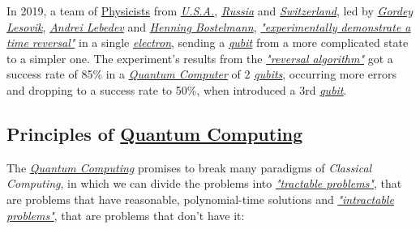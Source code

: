 \documentclass[conference]{IEEEtran}
\begin{document}
\vspace{4pt}

In 2019, a team of \href{https://en.wikipedia.org/wiki/Physicist}{Physicists} from \href{https://en.wikipedia.org/wiki/United_States}{\textit{U.S.A.}}, \href{https://en.wikipedia.org/wiki/Russia}{\textit{Russia}} and \href{https://en.wikipedia.org/wiki/Switzerland}{\textit{Switzerland}}, led by \href{https://www.researchgate.net/profile/Gordey_Lesovik}{\textit{Gordey Lesovik}}, \href{https://www.researchgate.net/profile/Andrey_Lebedev4}{\textit{Andrei Lebedev}} and \href{https://www.researchgate.net/profile/Henning_Bostelmann}{\textit{Henning Bostelmann}}, \href{https://en.wikipedia.org/wiki/Electron}{\textit{"experimentally demonstrate a time reversal"}} in a single \href{https://en.wikipedia.org/wiki/Electron}{\textit{electron}}, sending a \href{https://en.wikipedia.org/wiki/Qubit}{\textit{qubit}} from a more complicated state to a simpler one. The experiment's results from the \href{https://www.researchgate.net/publication/322160389_Arrow_of_time_and_its_reversal_on_IBM_quantum_computer}{\textit{"reversal algorithm"}} got a success rate of 85\% in a \href{https://en.wikipedia.org/wiki/Quantum_computing}{\textit{Quantum Computer}} of 2 \href{https://en.wikipedia.org/wiki/Qubit}{\textit{qubits}}, occurring more errors and dropping to a success rate to 50\%, when introduced a 3rd \href{https://en.wikipedia.org/wiki/Qubit}{\textit{qubit}}.

\vspace{6pt}

\subsection{Principles of \href{https://en.wikipedia.org/wiki/Quantum_computing}{Quantum Computing}}\label{AA}

The \href{https://en.wikipedia.org/wiki/Quantum_computing}{\textit{Quantum Computing}} promises to break many paradigms of \textit{Classical Computing}, in which we can divide the problems into \href{http://www.cs.ucc.ie/~dgb/courses/toc/handout29.pdf}{\textit{"tractable problems"}}, that are problems that have reasonable, polynomial-time solutions and \href{http://www.cs.ucc.ie/~dgb/courses/toc/handout29.pdf}{\textit{"intractable problems"}}, that are problems that don't have it:
\end{document}
